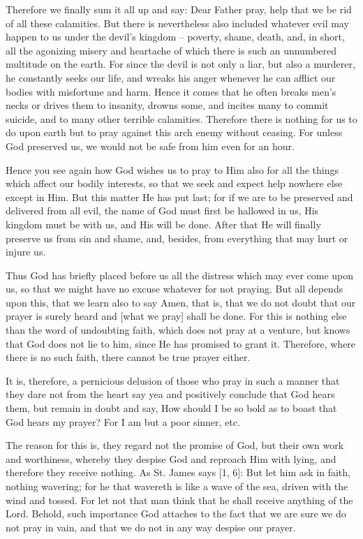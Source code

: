 Therefore we finally sum it all up and say: Dear Father pray, help that
we be rid of all these calamities. But there is nevertheless also
included whatever evil may happen to us under the devil's kingdom --
poverty, shame, death, and, in short, all the agonizing misery and
heartache of which there is such an unnumbered multitude on the earth.
For since the devil is not only a liar, but also a murderer, he
constantly seeks our life, and wreaks his anger whenever he can afflict
our bodies with misfortune and harm. Hence it comes that he often
breaks men's necks or drives them to insanity, drowns some, and incites
many to commit suicide, and to many other terrible calamities.
Therefore there is nothing for us to do upon earth but to pray against
this arch enemy without ceasing. For unless God preserved us, we would
not be safe from him even for an hour.

Hence you see again how God wishes us to pray to Him also for all the
things which affect our bodily interests, so that we seek and expect
help nowhere else except in Him. But this matter He has put last; for
if we are to be preserved and delivered from all evil, the name of God
must first be hallowed in us, His kingdom must be with us, and His will
be done. After that He will finally preserve us from sin and shame,
and, besides, from everything that may hurt or injure us.

Thus God has briefly placed before us all the distress which may ever
come upon us, so that we might have no excuse whatever for not praying.
But all depends upon this, that we learn also to say Amen, that is,
that we do not doubt that our prayer is surely heard and [what we pray]
shall be done. For this is nothing else than the word of undoubting
faith, which does not pray at a venture, but knows that God does not
lie to him, since He has promised to grant it. Therefore, where there
is no such faith, there cannot be true prayer either.

It is, therefore, a pernicious delusion of those who pray in such a
manner that they dare not from the heart say yea and positively
conclude that God hears them, but remain in doubt and say, How should I
be so bold as to boast that God hears my prayer? For I am but a poor
sinner, etc.

The reason for this is, they regard not the promise of God, but their
own work and worthiness, whereby they despise God and reproach Him with
lying, and therefore they receive nothing. As St. James says [1, 6]:
But let him ask in faith, nothing wavering; for he that wavereth is
like a wave of the sea, driven with the wind and tossed. For let not
that man think that he shall receive anything of the Lord. Behold, such
importance God attaches to the fact that we are sure we do not pray in
vain, and that we do not in any way despise our prayer.

